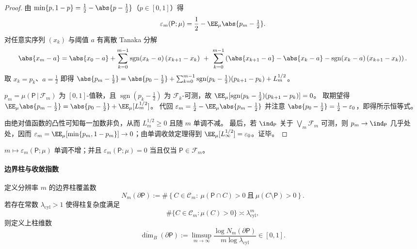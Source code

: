 \begin{proof}
由 \(\min\{p,1-p\}=\tfrac12-\abs{p-\tfrac12}\)（\(p\in[0,1]\)）得
\[
\varepsilon_m(\mathsf P;\mu)=\frac12-\EE_\mu\abs{p_m-\tfrac12}.
\]
对任意实序列 \((x_k)\) 与阈值 \(a\) 有离散 Tanaka 分解
\[
\abs{x_m-a}
=\abs{x_0-a}+\sum_{k=0}^{m-1}\operatorname{sgn}(x_k-a)\,(x_{k+1}-x_k)
\ +\ \sum_{k=0}^{m-1}\left(\abs{x_{k+1}-a}-\abs{x_k-a}-\operatorname{sgn}(x_k-a)\,(x_{k+1}-x_k)\right).
\]
取 \(x_k=p_k\)、\(a=\tfrac12\) 即得
\(
\abs{p_m-\tfrac12}=\abs{p_0-\tfrac12}+\sum_{k=0}^{m-1}\operatorname{sgn}(p_k-\tfrac12)(p_{k+1}-p_k)+L_m^{1/2}
\)。
\par
\(p_m=\mu(\mathsf P\,|\,\mathcal F_m)\) 为 \([0,1]\)-值鞅，且 \(\operatorname{sgn}(p_k-\tfrac12)\) 为 \(\mathcal F_k\)-可测，故
\(
\EE_\mu[\operatorname{sgn}(p_k-\tfrac12)(p_{k+1}-p_k)]=0
\)。
取期望得
\(
\EE_\mu\abs{p_m-\tfrac12}=\abs{p_0-\tfrac12}+\EE_\mu[L_m^{1/2}]
\)。
代回 \(\varepsilon_m=\tfrac12-\EE_\mu\abs{p_m-\tfrac12}\) 并注意 \(\abs{p_0-\tfrac12}=\tfrac12-\varepsilon_0\)，即得所示恒等式。
\par
由绝对值函数的凸性可知每一加数非负，从而 \(L_m^{1/2}\ge 0\) 且随 \(m\) 单调不减。
最后，若 \(\ind_{\mathsf P}\) 关于 \(\bigvee_m\mathcal F_m\) 可测，则 \(p_m\to \ind_{\mathsf P}\) 几乎处处，因而 \(\varepsilon_m=\EE_\mu[\min\{p_m,1-p_m\}]\to 0\)；由单调收敛定理得到 \(\EE_\mu[L_\infty^{1/2}]=\varepsilon_0\)。证毕。
\end{proof}

\begin{corollary}[清晰度的基本性质]\label{cor:spg-clarity-basic}
$m\mapsto\varepsilon_m(\mathsf P;\mu)$ 单调不增；并且 $\varepsilon_m(\mathsf P;\mu)=0$ 当且仅当 $\mathsf P\in\mathcal{F}_m$。
\end{corollary}

\paragraph{边界柱与收敛指数}
\begin{definition}\label{def:spg-boundary-cylinder-dimension}
定义分辨率 $m$ 的边界柱覆盖数
\[
N_m(\partial\mathsf P)
:=\#\left\{C\in\mathcal{C}_m:\ \mu(\mathsf P\cap C)>0\ \text{且}\ \mu(C\setminus \mathsf P)>0\right\}.
\]
若存在常数 $\lambda_{\mathrm{cyl}}>1$ 使得柱复杂度满足
\[
\#\{C\in\mathcal{C}_m:\mu(C)>0\}\asymp \lambda_{\mathrm{cyl}}^m,
\]
则定义上柱维数
\[
\overline{\dim}_B(\partial\mathsf P)
:=\limsup_{m\to\infty}\frac{\log N_m(\partial\mathsf P)}{m\log\lambda_{\mathrm{cyl}}}\in[0,1].
\]
\end{definition}

